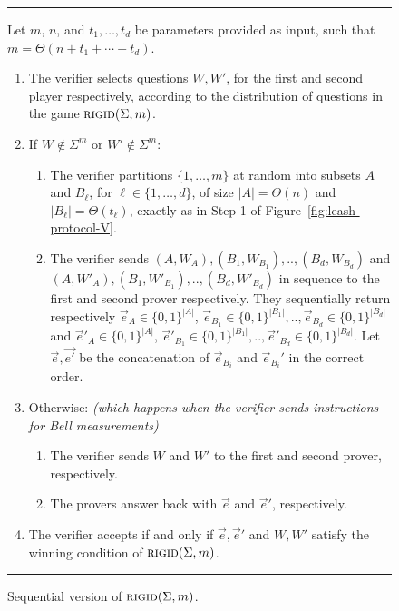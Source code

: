 \begin{figure}[H]
\rule[1ex]{\textwidth}{0.5pt}
\vspace{-25pt}
\justify 
Let $m$, $n$, and $t_1,\ldots,t_d$ be parameters provided as input, such that $m = \Theta(n+t_1+\cdots+t_d)$. 
\begin{enumerate}
\item The verifier selects questions $W,W'$, for the first and second player respectively, according to the distribution of questions in the game $\textsc{rigid}(\Sigma,m)$.
\item If $W \not\in \Sigma^m$ or $W' \not\in \Sigma^m$: 
\begin{enumerate}
\item The verifier partitions $\{1,\ldots,m\}$ at random into subsets $A$ and $B_\ell$, for $\ell\in\{1,\ldots,d\}$, of size $|A|=\Theta(n)$ and $|B_\ell|=\Theta(t_\ell)$, exactly as in Step 1 of Figure~\ref{fig:leash-protocol-V}. 
\item The verifier sends $(A,W_A), (B_1,W_{B_1}),.., (B_d,W_{B_d})$ and $(A,W'_A), (B_1,W'_{B_1}), .., (B_d,W'_{B_d})$ in sequence to the first and second prover respectively. They sequentially return respectively $\vec{e}_A \in \{0,1\}^{|A|}$, $\vec{e}_{B_1} \in \{0,1\}^{|B_1|},.., \vec{e}_{B_d} \in \{0,1\}^{|B_d|}$ and $\vec{e}'_A \in \{0,1\}^{|A|}$, $\vec{e}'_{B_1} \in \{0,1\}^{|B_1|},.., \vec{e}'_{B_d} \in \{0,1\}^{|B_d|}$. Let $\vec{e},\vec{e'}$ be the concatenation of $\vec{e}_{B_i}$ and $\vec{e}_{B_i}'$ in the correct order.
\end{enumerate}
\item Otherwise: \textit{(which happens when the verifier sends instructions for Bell measurements)} 
\begin{enumerate}
    \item The verifier sends $W$ and $W'$ to the first and second prover, respectively. 
    \item The provers answer back with $\vec{e}$ and $\vec{e}'$, respectively.
\end{enumerate}

\item The verifier accepts if and only if $\vec{e},\vec{e}'$ and $W,W'$ satisfy the winning condition of $\textsc{rigid}(\Sigma,m)$.
\end{enumerate}
\rule[2ex]{\textwidth}{0.5pt}\vspace{-.5cm}
\caption{Sequential version of $\textsc{rigid}(\Sigma,m)$.}
\label{fig:consistency-game}
\label{fig:rigidity-sequential}
\end{figure} 


